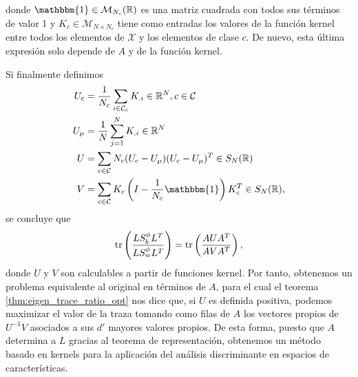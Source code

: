 donde $\mathbbm{1} \in \mathcal{M}_{N_c}(\R)$ es una matriz cuadrada con todos sus términos de valor 1 y $K_c \in \mathcal{M}_{N\times N_c}$ tiene como entradas los valores de la función kernel entre todos los elementos de $\mathcal{X}$ y los elementos de clase $c$. De nuevo, esta última expresión solo depende de $A$ y de la función kernel.

Si finalmente definimos
\begin{equation*}
    \begin{split}
        U_c &= \frac{1}{N_c}\sum_{i \in \mathcal{C}_c}K_{.i} \in \R^N, c \in \mathcal{C}\\
        U_{\mu} &= \frac{1}{N}\sum_{j=1}^N K_{.i} \in \R^N \\
        U &= \sum_{c \in \mathcal{C}} N_c(U_c - U_{\mu})(U_c - U_{\mu})^T \in S_N(\R) \\
        V &= \sum_{c \in \mathcal{C}} K_c\left(I - \frac{1}{N_c}\mathbbm{1}\right)K_c^T \in S_N(\R),
    \end{split}
\end{equation*}
se concluye que
\begin{equation*}
    \operatorname{tr}\left(\frac{L S_b^{\phi} L^T}{LS_w^{\phi}L^T}\right) = \operatorname{tr}\left(\frac{AUA^T}{AVA^T} \right),
\end{equation*}
donde $U$ y $V$ son calculables a partir de funciones kernel. Por tanto, obtenemos un problema equivalente al original en términos de $A$, para el cual el teorema \ref{thm:eigen_trace_ratio_opt} nos dice que, si $U$ es definida positiva, podemos maximizar el valor de la traza tomando como filas de $A$ los vectores propios de $U^{-1}V$ asociados a sus $d'$ mayores valores propios. De esta forma, puesto que $A$ determina a $L$ gracias al teorema de representación, obtenemos un método basado en kernels para la aplicación del análisis discriminante en espacios de características.
